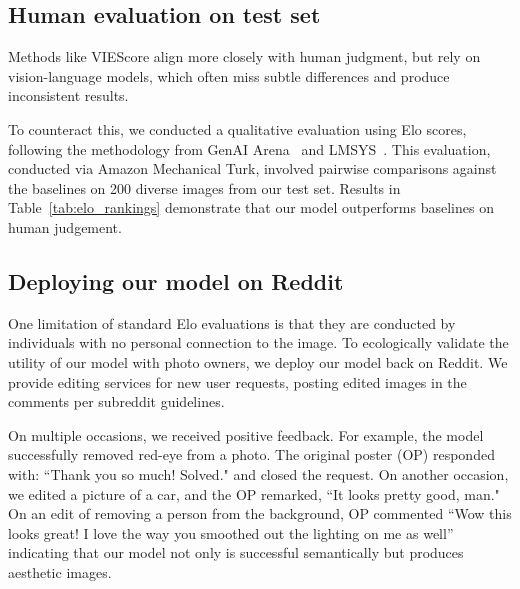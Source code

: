 



\subsection{Human evaluation on \ours test set}

Methods like VIEScore\cite{ku2023viescore} align more closely with human judgment, but rely on vision-language models, which often miss subtle differences and produce inconsistent results. 



To counteract this, we conducted a qualitative evaluation using Elo scores, following the methodology from GenAI Arena~\cite{jiang2024genai} and LMSYS~\cite{zheng2023judging}. This evaluation, conducted via Amazon Mechanical Turk, involved pairwise comparisons against the baselines on 200 diverse images from our test set. Results in Table~\ref{tab:elo_rankings} demonstrate that our model outperforms baselines on human judgement.


\subsection{Deploying our model on Reddit}
One limitation of standard Elo evaluations is that they are conducted by individuals with no personal connection to the image. To ecologically validate the utility of our model with photo owners, we deploy our model back on Reddit. We provide editing services for new user requests, posting edited images in the comments per subreddit guidelines.

On multiple occasions, we received positive feedback.
For example, the model successfully removed red-eye from a photo. The original poster (OP) responded with: ``Thank you so much! Solved." and closed the request. On another occasion, we edited a picture of a car, and the OP remarked, ``It looks pretty good, man." On an edit of removing a person from the background, OP commented ``Wow this looks great! I love the way you smoothed out the lighting on me as well'' indicating that our model not only is successful semantically but produces aesthetic images.

